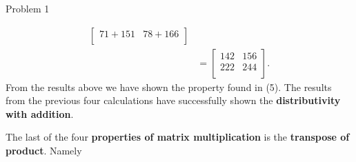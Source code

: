 \begin{problem}{Problem 1}
\begin{highlight}[Solution]
\begin{align*}
\begin{bmatrix}
                71 + 151 & 78 + 166 \\
            \end{bmatrix} \\
            & = 
            \begin{bmatrix}
                142 & 156 \\
                222 & 244 \\
            \end{bmatrix}.
        \end{align*}
        From the results above we have shown the property found in (5). The results from the previous four calculations have successfully shown the \textbf{distributivity with addition}.

        The last of the four \textbf{properties of matrix multiplication} is the \textbf{transpose of product}. Namely


\end{highlight}
\end{problem}
